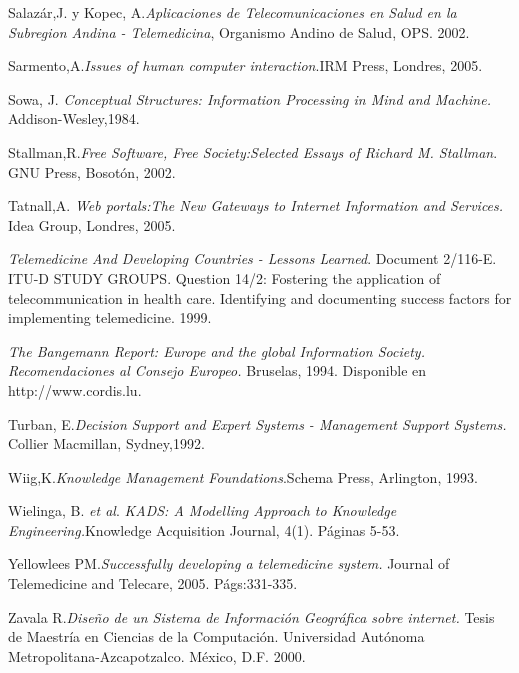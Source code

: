 \begin{thebibliography}{}
 Salazár,J. y Kopec, A.\textit{Aplicaciones de Telecomunicaciones en Salud en la Subregion Andina - Telemedicina}, Organismo Andino de Salud, OPS. 2002.

 Sarmento,A.\textit{Issues of human computer interaction}.IRM Press, Londres, 2005. 

 Sowa, J. \textit{Conceptual Structures: Information Processing in Mind and Machine.} Addison-Wesley,1984.

 Stallman,R.\textit{Free Software, Free Society:Selected Essays of Richard M. Stallman}. GNU Press, Bosotón, 2002.

 Tatnall,A. \textit{Web portals:The New Gateways to Internet Information and Services.} Idea Group, Londres, 2005.

 \textit{Telemedicine And Developing Countries - Lessons Learned}. Document 2/116-E. ITU-D STUDY GROUPS. Question 14/2: Fostering the application of telecommunication in health care.  Identifying and documenting success factors for implementing telemedicine. 1999.

 \textit{The Bangemann Report: Europe and the global Information Society. Recomendaciones al Consejo Europeo.} Bruselas, 1994. Disponible en http://www.cordis.lu.

 Turban, E.\textit{Decision Support and Expert Systems - Management Support Systems.} Collier Macmillan, Sydney,1992.

 Wiig,K.\textit{Knowledge Management Foundations}.Schema Press, Arlington, 1993. 

 Wielinga, B. \textit{et al}. \textit{KADS: A Modelling Approach to Knowledge Engineering.}Knowledge Acquisition Journal, 4(1). Páginas 5-53.

 Yellowlees PM.\textit{Successfully developing a telemedicine system.} Journal of Telemedicine and Telecare, 2005. Págs:331-335.

 Zavala R.\textit{Diseño de un Sistema de Información Geográfica sobre internet.} Tesis de Maestría en Ciencias de la Computación. Universidad Autónoma Metropolitana-Azcapotzalco. México, D.F. 2000.

\end{thebibliography}
